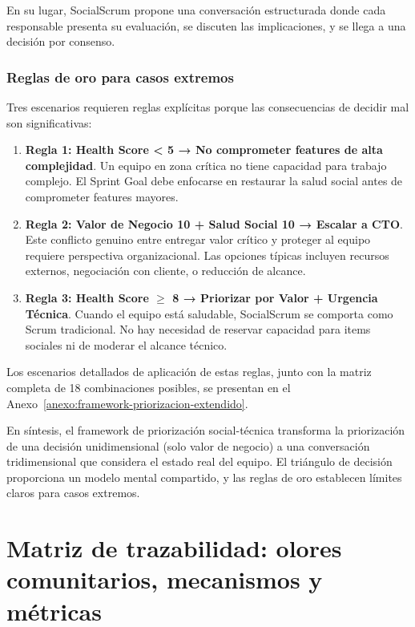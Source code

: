 En su lugar, SocialScrum propone una conversación estructurada donde cada responsable presenta su evaluación, se discuten las implicaciones, y se llega a una decisión por consenso.

\subsubsection{Reglas de oro para casos extremos}

Tres escenarios requieren reglas explícitas porque las consecuencias de decidir mal son significativas:

\begin{enumerate}
    \item \textbf{Regla 1: Health Score < 5 → No comprometer features de alta complejidad}. Un equipo en zona crítica no tiene capacidad para trabajo complejo. El Sprint Goal debe enfocarse en restaurar la salud social antes de comprometer features mayores.

    \item \textbf{Regla 2: Valor de Negocio 10 + Salud Social 10 → Escalar a CTO}. Este conflicto genuino entre entregar valor crítico y proteger al equipo requiere perspectiva organizacional. Las opciones típicas incluyen recursos externos, negociación con cliente, o reducción de alcance.

    \item \textbf{Regla 3: Health Score $\geq$ 8 → Priorizar por Valor + Urgencia Técnica}. Cuando el equipo está saludable, SocialScrum se comporta como Scrum tradicional. No hay necesidad de reservar capacidad para items sociales ni de moderar el alcance técnico.
\end{enumerate}

Los escenarios detallados de aplicación de estas reglas, junto con la matriz completa de 18 combinaciones posibles, se presentan en el Anexo~\ref{anexo:framework-priorizacion-extendido}.

En síntesis, el framework de priorización social-técnica transforma la priorización de una decisión unidimensional (solo valor de negocio) a una conversación tridimensional que considera el estado real del equipo. El triángulo de decisión proporciona un modelo mental compartido, y las reglas de oro establecen límites claros para casos extremos.

\section{Matriz de trazabilidad: olores comunitarios, mecanismos y métricas}
\label{sec:matriz-trazabilidad-smells}

